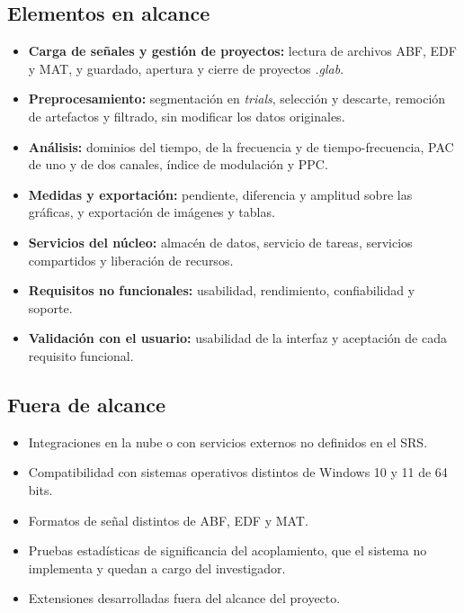 \documentclass[12pt,letterpaper,oneside]{article}
\DeclareRobustCommand{\_}{\textunderscore\allowbreak}
\begin{document}
\subsection{Elementos en alcance}
\begin{itemize}
    \item \textbf{Carga de señales y gestión de proyectos:} lectura de archivos ABF, EDF y MAT, y guardado, apertura y cierre de proyectos \textit{.glab}.
    \item \textbf{Preprocesamiento:} segmentación en \textit{trials}, selección y descarte, remoción de artefactos y filtrado, sin modificar los datos originales.
    \item \textbf{Análisis:} dominios del tiempo, de la frecuencia y de tiempo-frecuencia, PAC de uno y de dos canales, índice de modulación y PPC.
    \item \textbf{Medidas y exportación:} pendiente, diferencia y amplitud sobre las gráficas, y exportación de imágenes y tablas.
    \item \textbf{Servicios del núcleo:} almacén de datos, servicio de tareas, servicios compartidos y liberación de recursos.
    \item \textbf{Requisitos no funcionales:} usabilidad, rendimiento, confiabilidad y soporte.
    \item \textbf{Validación con el usuario:} usabilidad de la interfaz y aceptación de cada requisito funcional.
\end{itemize}

\subsection{Fuera de alcance}
\begin{itemize}
    \item Integraciones en la nube o con servicios externos no definidos en el SRS.
    \item Compatibilidad con sistemas operativos distintos de Windows 10 y 11 de 64 bits.
    \item Formatos de señal distintos de ABF, EDF y MAT.
    \item Pruebas estadísticas de significancia del acoplamiento, que el sistema no implementa y quedan a cargo del investigador.
    \item Extensiones desarrolladas fuera del alcance del proyecto.
\end{itemize}
\end{document}
